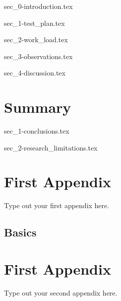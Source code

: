 \documentclass[a4paper,oneside,12pt]{report}
\newcommand{\db}[1]{\textcolor{blue!40}{#1}}
\begin{document}
{sec_0-introduction.tex}
\label{se:results_intro}

{sec_1-test_plan.tex}
\label{se:test_plan}

{sec_2-work_load.tex}
\label{se:work_load}

{sec_3-observations.tex}
\label{se:observations}

{sec_4-discussion.tex}
\label{se:discussion}

\chapter{\db{Summary}}
\label{ch:conc}

{sec_1-conclusions.tex}

{sec_2-research_limitations.tex}

\appendix
\chapter{First Appendix}
Type out your first appendix here.
\section{Basics}

\chapter{First Appendix}
Type out your second appendix here.

\graphicspath{ {./images/} }



\end{document}
